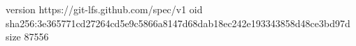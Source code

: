 version https://git-lfs.github.com/spec/v1
oid sha256:3e365771cd27264cd5e9c5866a8147d68dab18ec242e193343858d48ce3bd97d
size 87556
